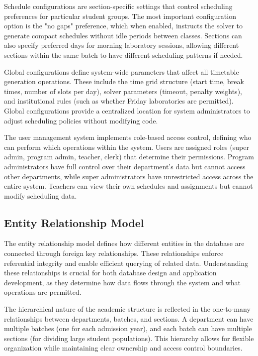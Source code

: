 \documentclass[12pt,a4paper]{article}
\begin{document}
Schedule configurations are section-specific settings that control scheduling preferences for particular student groups. The most important configuration option is the "no gaps" preference, which when enabled, instructs the solver to generate compact schedules without idle periods between classes. Sections can also specify preferred days for morning laboratory sessions, allowing different sections within the same batch to have different scheduling patterns if needed.

Global configurations define system-wide parameters that affect all timetable generation operations. These include the time grid structure (start time, break times, number of slots per day), solver parameters (timeout, penalty weights), and institutional rules (such as whether Friday laboratories are permitted). Global configurations provide a centralized location for system administrators to adjust scheduling policies without modifying code.

The user management system implements role-based access control, defining who can perform which operations within the system. Users are assigned roles (super admin, program admin, teacher, clerk) that determine their permissions. Program administrators have full control over their department's data but cannot access other departments, while super administrators have unrestricted access across the entire system. Teachers can view their own schedules and assignments but cannot modify scheduling data.


\subsection{Entity Relationship Model}

The entity relationship model defines how different entities in the database are connected through foreign key relationships. These relationships enforce referential integrity and enable efficient querying of related data. Understanding these relationships is crucial for both database design and application development, as they determine how data flows through the system and what operations are permitted.

The hierarchical nature of the academic structure is reflected in the one-to-many relationships between departments, batches, and sections. A department can have multiple batches (one for each admission year), and each batch can have multiple sections (for dividing large student populations). This hierarchy allows for flexible organization while maintaining clear ownership and access control boundaries.
\end{document}
